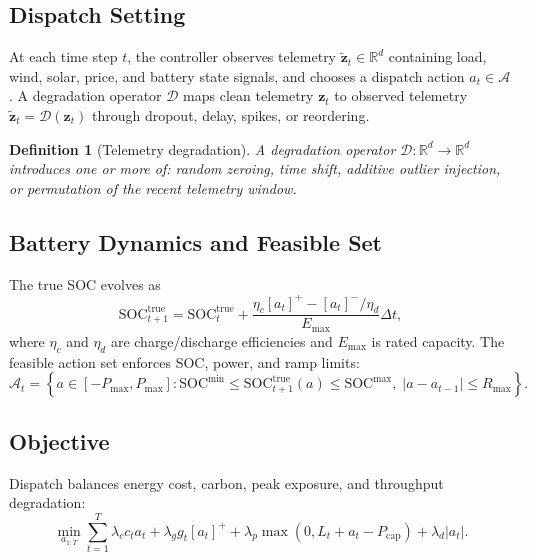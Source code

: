 \documentclass[11pt,a4paper]{article}
\newtheorem{definition}{Definition}
\begin{document}
\subsection{Dispatch Setting}

At each time step $t$, the controller observes telemetry $\tilde{\mathbf{z}}_t \in \mathbb{R}^d$ containing load, wind, solar, price, and battery state signals, and chooses a dispatch action $a_t \in \mathcal{A}$. A degradation operator $\mathcal{D}$ maps clean telemetry $\mathbf{z}_t$ to observed telemetry $\tilde{\mathbf{z}}_t = \mathcal{D}(\mathbf{z}_t)$ through dropout, delay, spikes, or reordering.

\begin{definition}[Telemetry degradation]
A degradation operator $\mathcal{D}: \mathbb{R}^d \rightarrow \mathbb{R}^d$ introduces one or more of: random zeroing, time shift, additive outlier injection, or permutation of the recent telemetry window.
\end{definition}

\subsection{Battery Dynamics and Feasible Set}

The true SOC evolves as
\begin{equation}\label{eq:soc_dynamics}
  \mathrm{SOC}_{t+1}^{\mathrm{true}} =
  \mathrm{SOC}_{t}^{\mathrm{true}} +
  \frac{\eta_c [a_t]^+ - [a_t]^- / \eta_d}{E_{\max}} \Delta t,
\end{equation}
where $\eta_c$ and $\eta_d$ are charge/discharge efficiencies and $E_{\max}$ is rated capacity. The feasible action set enforces SOC, power, and ramp limits:
\begin{equation}\label{eq:constraints}
  \mathcal{A}_t =
  \left\{a \in [-P_{\max}, P_{\max}] :
    \mathrm{SOC}^{\min} \le \mathrm{SOC}_{t+1}^{\mathrm{true}}(a) \le \mathrm{SOC}^{\max},\;
    |a-a_{t-1}| \le R_{\max}
  \right\}.
\end{equation}

\subsection{Objective}

Dispatch balances energy cost, carbon, peak exposure, and throughput degradation:
\begin{equation}\label{eq:objective}
  \min_{a_{1:T}} \sum_{t=1}^{T}
  \lambda_c c_t a_t +
  \lambda_g g_t [a_t]^+ +
  \lambda_p \max(0, L_t + a_t - P_{\mathrm{cap}}) +
  \lambda_d |a_t|.
\end{equation}
\end{document}
